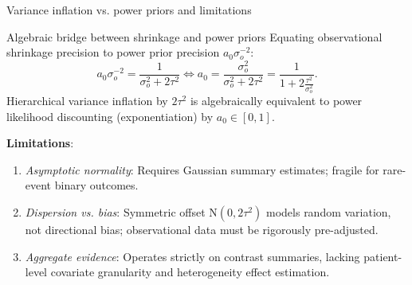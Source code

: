 \documentclass[t]{beamer}
\begin{document}
\begin{frame}{Variance inflation vs. power priors and limitations}
    \begin{block}{Algebraic bridge between shrinkage and power priors}
    Equating observational shrinkage precision to power prior precision $a_0 \sigma_o^{-2}$:
    \begin{equation*}
        a_0 \sigma_o^{-2} = \frac{1}{\sigma_o^2 + 2\tau^2} \iff a_0 = \frac{\sigma_o^2}{\sigma_o^2 + 2\tau^2} = \frac{1}{1 + 2\frac{\tau^2}{\sigma_o^2}}.
    \end{equation*}
    Hierarchical variance inflation by $2\tau^2$ is algebraically equivalent to power likelihood discounting (exponentiation) by $a_0 \in [0, 1]$.
    \end{block}

    \textbf{Limitations}:
    \begin{enumerate}
        \item \emph{Asymptotic normality}: Requires Gaussian summary estimates; fragile for rare-event binary outcomes.
        \item \emph{Dispersion vs. bias}: Symmetric offset $\text{N}(0, 2\tau^2)$ models random variation, not directional bias; observational data must be rigorously pre-adjusted.
        \item \emph{Aggregate evidence}: Operates strictly on contrast summaries, lacking patient-level covariate granularity and heterogeneity effect estimation.
    \end{enumerate}
\end{frame}
\end{document}
